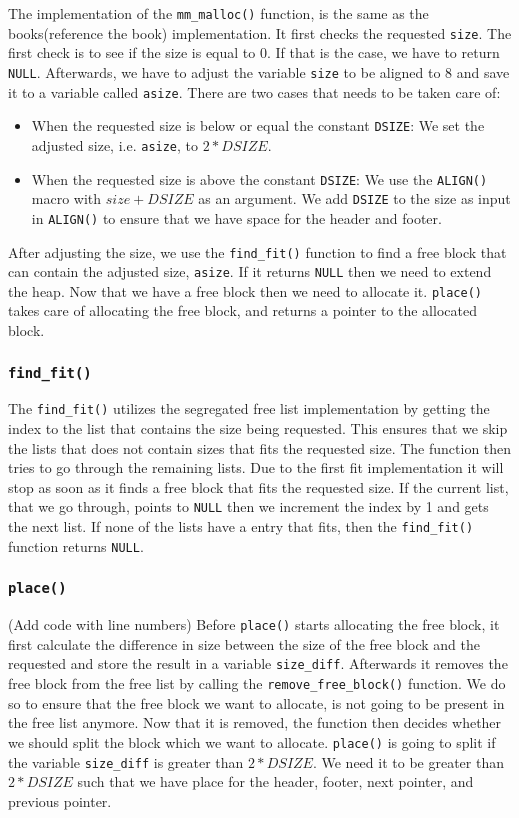 \documentclass[11pt]{article}
\newcommand{\code}[1]{{\colorbox{lightgray!15}{\color{black}\texttt{#1}}}}
\newcommand{\temp}[1]{{\color{red}#1}}
\begin{document}
The implementation of the \code{mm\_malloc()} function, is the same as the books\temp{(reference the book)} implementation.
It first checks the requested \code{size}. The first check is to see if the size is equal to 0. If that is the case, we have to return \code{NULL}.
Afterwards, we have to adjust the variable \code{size} to be aligned to 8 and save it to a variable called \code{asize}. 
There are two cases that needs to be taken care of:
\begin{itemize}
    \item When the requested size is below or equal the constant \code{DSIZE}: We set the adjusted size, i.e. \code{asize}, to $2 * DSIZE$.
    \item When the requested size is above the constant \code{DSIZE}: We use the \code{ALIGN()} macro with $size + DSIZE$ as an argument. We add \code{DSIZE} to the size as input
    in \code{ALIGN()} to ensure that we have space for the header and footer.
\end{itemize}

After adjusting the size, we use the \code{find\_fit()} function to find a free block that can contain the adjusted size, \code{asize}. If it returns \code{NULL} then we need to extend the
heap. 
Now that we have a free block then we need to allocate it. 
\code{place()} takes care of allocating the free block, and returns a pointer to the allocated block.

\subsubsection{\code{find\_fit()}}
The \code{find\_fit()} utilizes the segregated free list implementation by getting the index to the list that contains the size being requested.
This ensures that we skip the lists that does not contain sizes that fits the requested size. 
The function then tries to go through the remaining lists. Due to the first fit implementation it will stop as soon as it finds
a free block that fits the requested size. If the current list, that we go through, points to \code{NULL} then we increment the index by 1 and gets the next list.
If none of the lists have a entry that fits, then the \code{find\_fit()} function returns \code{NULL}.

\subsubsection{\code{place()}}
\temp{(Add code with line numbers)}
Before \code{place()} starts allocating the free block, it first calculate the difference in size between the size of the free block and the requested and store the result in a variable \code{size\_diff}.
Afterwards it removes the free block from the free list by calling the \code{remove\_free\_block()} function. We do so to ensure that the free block we want to allocate, 
is not going to be present in the free list anymore. Now that it is removed, the function then decides whether we should split the block which we want to allocate. 
\code{place()} is going to split if the variable \code{size\_diff} is greater than $2 * DSIZE$.
We need it to be greater than $2 * DSIZE$ such that we have place for the header, footer, next pointer, and previous pointer. 
\end{document}
